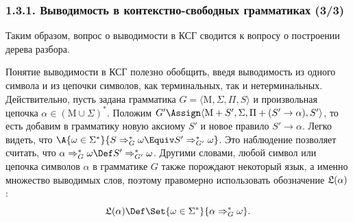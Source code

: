 \begin{frame}
\frametitle{1.3.1. Выводимость в контекстно-свободных грамматиках (3/3)}


Таким образом, вопрос о выводимости в КСГ
сводится к вопросу о построении дерева разбора. 

\medskip 
Понятие выводимости в КСГ полезно обобщить, введя выводимость     
из одного символа и из цепочки символов, как терминальных, так и нетерминальных.
Действительно, пусть
задана грамматика $G=\langle \mathrm{M}, \Sigma, \Pi, S \rangle$ и
произвольная цепочка $\alpha \in (\mathrm{M}\cup\Sigma)^*$.
Положим $G' \Assign \langle \mathrm{M}+S', \Sigma, \Pi+(S'\to\alpha), S' \rangle$,
то есть добавим в грамматику новую аксиому $S'$
и новое правило $S' \to\alpha$. Легко видеть, что
$\A{\omega\in\Sigma^*}{S\Rightarrow^*_G \omega \Equiv S'\Rightarrow^*_{G'} \omega}$. 
Это наблюдение позволяет считать, что
$ \alpha\Rightarrow^*_G \omega \Def S'\Rightarrow^*_{G'} \omega$.
Другими словами, любой символ или 
цепочка символов $\alpha$ в грамматике $G$ также порождают некоторый язык, а именно множество выводимых слов, поэтому правомерно использовать обозначение
$\frak{L}(\alpha)$:
$$\frak{L}(\alpha)\Def\Set{\omega\in\Sigma^*}{\alpha\Rightarrow^*_G \omega}.$$
       
\end{frame}


